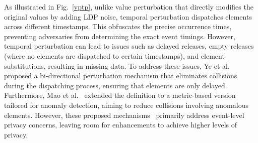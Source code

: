 As illustrated in Fig.~\ref{vptp}, unlike value perturbation that directly modifies the original values by adding LDP noise, temporal perturbation dispatches elements across different timestamps. This obfuscates the precise occurrence times, preventing adversaries from determining the exact event timings. However, temporal perturbation can lead to issues such as delayed releases, empty releases (where no elements are dispatched to certain timestamps), and element substitutions, resulting in missing data.  To address these issues,  Ye et al.~\cite{ye2023stateful} proposed a bi-directional perturbation mechanism that eliminates collisions during the dispatching process, ensuring that elements are only delayed. Furthermore, Mao et al.~\cite{mao2023utility} extended the definition to a metric-based version tailored for anomaly detection, aiming to reduce collisions involving anomalous elements.  However, these proposed mechanisms~\cite{ye2021beyond, ye2023stateful, mao2023utility} primarily address event-level privacy concerns, leaving room for enhancements to achieve higher levels of privacy.





















